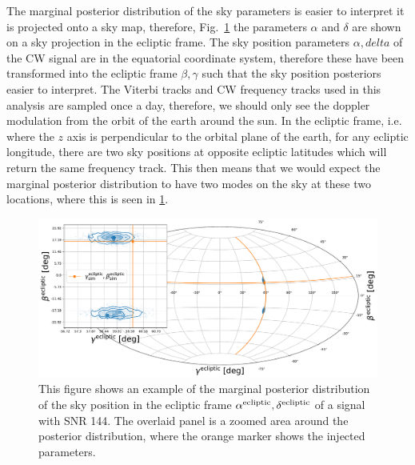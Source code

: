 The marginal posterior distribution of the sky parameters is easier to interpret it is projected onto a sky map, therefore, Fig.~\ref{par_est:results:example_skypos} the parameters $\alpha$ and $\delta$ are shown on a sky projection in the ecliptic frame.
The sky position parameters $\alpha,delta$ of the \gls{CW} signal are in the equatorial coordinate system, therefore these have been transformed into the ecliptic frame $\beta,\gamma$ such that the sky position posteriors easier to interpret.
The Viterbi tracks and \gls{CW} frequency tracks used in this analysis are sampled once a day, therefore, we should only see the doppler modulation from the orbit of the earth around the sun.
In the ecliptic frame, i.e. where the $z$ axis is perpendicular to the orbital plane of the earth, for any ecliptic longitude, there are two sky positions at opposite ecliptic latitudes which will return the same frequency track. 
This then means that we would expect the marginal posterior distribution to have two modes on the sky at these two locations, where this is seen in \ref{par_est:results:example_skypos}.

%
\begin{figure}[ht]
    \centering
    \includegraphics[width=\linewidth]{C5_parameter/skypos_ecliptic.pdf}
    \caption[Example of posterior of sky position in ecliptic frame]{This figure shows an example of the marginal posterior distribution of the sky position in the ecliptic frame $\alpha^{\rm{ecliptic}},\delta^{\rm{ecliptic}}$ of a signal with \gls{SNR} 144. The overlaid panel is a zoomed area around the posterior distribution, where the orange marker shows the injected parameters.}
    \label{par_est:results:example_skypos}
    
\end{figure}
%

%
%
